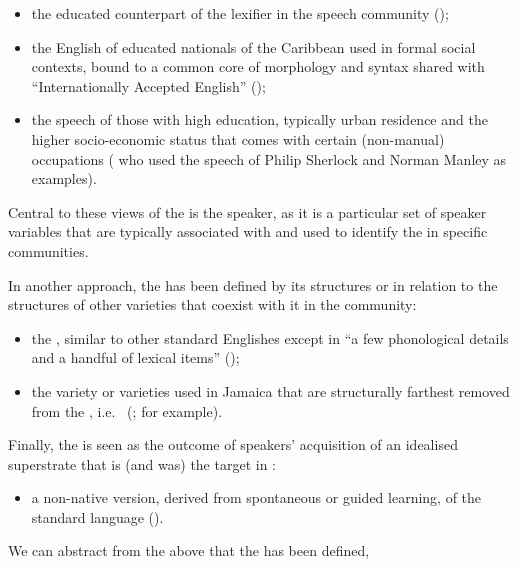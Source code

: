 \begin{itemize}
\item the educated counterpart of the lexifier in the  speech community (\citealt[xi (n1)]{Chaudenson2001});
\item the English of educated nationals of the Caribbean used in formal social contexts, bound to a common core of morphology and syntax shared with “Internationally Accepted English” (\citealt[lvi]{Allsopp1996});
\item the speech of those with high education, typically urban residence and the higher socio-economic status that comes with certain (non-manual) occupations (\citealt{DeCamp1961,DeCamp1971} who used the speech of Philip Sherlock and Norman Manley as examples).
\end{itemize}

Central to these views of the  is the speaker, as it is a particular set of speaker variables that are typically associated with and used to identify the  in specific communities.  

In another approach, the  has been defined by its structures or in relation to the structures of other varieties that coexist with it in the community:

\begin{itemize}
\item the , similar to other standard Englishes except in “a few phonological details and a handful of lexical items” (\citealt[24]{Bickerton1975});
\item the variety or varieties used in Jamaica that are structurally farthest removed from the , i.e.\  (\citealt[73]{Akers1981}; \citealt[342]{Bailey1971} for example). 
\end{itemize}

Finally, the  is seen as the outcome of  speakers’ acquisition of an idealised superstrate that is (and was) the target in :    

\begin{itemize}
\item a non-native version, derived from spontaneous or guided learning, of the standard language (\citealt[67]{Escure1997}).    
\end{itemize}

We can abstract from the above that the  has been defined, 

